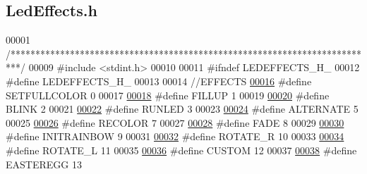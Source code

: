 \hypertarget{_led_effects_8h_source}{}\subsection{Led\+Effects.\+h}

\begin{DoxyCode}
00001 \textcolor{comment}{/**************************************************************************/}
00009 \textcolor{preprocessor}{#include <stdint.h>}
00010 
00011 \textcolor{preprocessor}{#ifndef LEDEFFECTS\_H\_}
00012 \textcolor{preprocessor}{#define LEDEFFECTS\_H\_}
00013 
00014 \textcolor{comment}{//EFFECTS}
\hypertarget{_led_effects_8h_source_l00016}{}\hyperlink{_led_effects_8h_a996334f1d53296a931624800377d5b01}{00016} \textcolor{comment}{}\textcolor{preprocessor}{#define SETFULLCOLOR 0  }
00017 
\hypertarget{_led_effects_8h_source_l00018}{}\hyperlink{_led_effects_8h_a2f349ea8f5412514d90f138ede08da62}{00018} \textcolor{preprocessor}{#define FILLUP 1}
00019 
\hypertarget{_led_effects_8h_source_l00020}{}\hyperlink{_led_effects_8h_a38eec52a7dccb94ff563e30eda32c891}{00020} \textcolor{preprocessor}{#define BLINK 2 }
00021 
\hypertarget{_led_effects_8h_source_l00022}{}\hyperlink{_led_effects_8h_ab6e06c8b4c17edc65d75be641a0fc39b}{00022} \textcolor{preprocessor}{#define RUNLED 3    }
00023 
\hypertarget{_led_effects_8h_source_l00024}{}\hyperlink{_led_effects_8h_ac7190c598c8618207180d135c0650dac}{00024} \textcolor{preprocessor}{#define ALTERNATE 5 }
00025 
\hypertarget{_led_effects_8h_source_l00026}{}\hyperlink{_led_effects_8h_a6b71fe4d23960c3701fc935a3368a6cc}{00026} \textcolor{preprocessor}{#define RECOLOR 7   }
00027 
\hypertarget{_led_effects_8h_source_l00028}{}\hyperlink{_led_effects_8h_ad8150289b0e08f01126500379852a2a7}{00028} \textcolor{preprocessor}{#define FADE 8      }
00029 
\hypertarget{_led_effects_8h_source_l00030}{}\hyperlink{_led_effects_8h_a2805176df86592658ae06a508a558720}{00030} \textcolor{preprocessor}{#define INITRAINBOW 9   }
00031 
\hypertarget{_led_effects_8h_source_l00032}{}\hyperlink{_led_effects_8h_a85bd242525add173bd67847b7acac00b}{00032} \textcolor{preprocessor}{#define ROTATE\_R 10     }
00033 
\hypertarget{_led_effects_8h_source_l00034}{}\hyperlink{_led_effects_8h_a4a0c329f45825186172aee0c62531423}{00034} \textcolor{preprocessor}{#define ROTATE\_L 11 }
00035 
\hypertarget{_led_effects_8h_source_l00036}{}\hyperlink{_led_effects_8h_a686dea444026cbf1236c24e7edb3a96d}{00036} \textcolor{preprocessor}{#define CUSTOM 12   }
00037 
\hypertarget{_led_effects_8h_source_l00038}{}\hyperlink{_led_effects_8h_a5645ec20d3cd39bfc1c9ad5ec99db2f2}{00038} \textcolor{preprocessor}{#define EASTEREGG 13        }

\end{DoxyCode}

